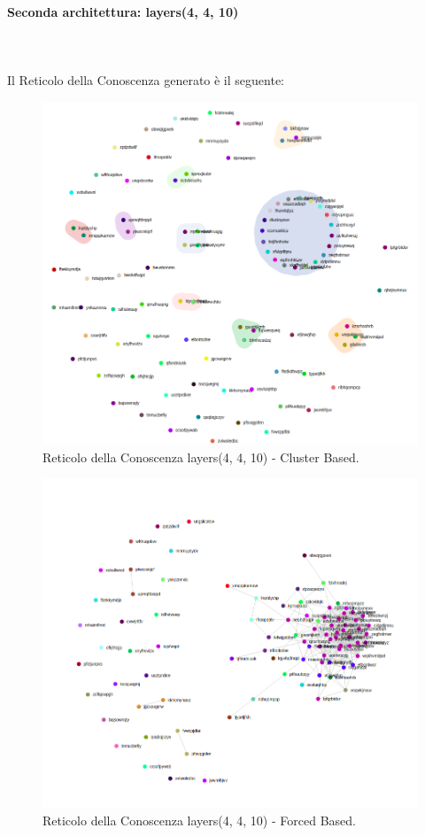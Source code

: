 \paragraph{Seconda architettura: layers(4, 4, 10)}\mbox{}\\\\
\label{Seconda architettura}
\noindent
Il Reticolo della Conoscenza generato è il seguente:
\begin{figure}[H]
\centering
	\includegraphics[width=0.70\linewidth]{./image/logica(4,4,10).png}
	\caption{Reticolo della Conoscenza layers(4, 4, 10) - Cluster Based.}
	\label{Reticolo della Conoscenza layers(4, 4, 10) - Cluster Based.}
\end{figure}
\noindent

\begin{figure}[H]
\centering
	\includegraphics[width=0.70\linewidth]{./image/logica(4,4,10)_forced.png}
	\caption{Reticolo della Conoscenza layers(4, 4, 10) - Forced Based.}
	\label{Reticolo della Conoscenza layers(4, 4, 10) - Forced Based.}
\end{figure}
\noindent

